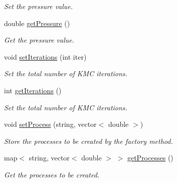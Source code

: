 \begin{DoxyCompactItemize}
\begin{DoxyCompactList}\small\item\em Set the pressure value. \end{DoxyCompactList}\item 
\mbox{\label{classUtils_1_1Parameters_aa24d0f50720f02d44c6eccba5f2864ca}} 
double \mbox{\hyperlink{classUtils_1_1Parameters_aa24d0f50720f02d44c6eccba5f2864ca}{get\+Pressure}} ()
\begin{DoxyCompactList}\small\item\em Get the pressure value. \end{DoxyCompactList}\item 
\mbox{\label{classUtils_1_1Parameters_a68dfe891b7f1a26d7bafa8cbc8488a22}} 
void \mbox{\hyperlink{classUtils_1_1Parameters_a68dfe891b7f1a26d7bafa8cbc8488a22}{set\+Iterations}} (int iter)
\begin{DoxyCompactList}\small\item\em Set the total number of K\+MC iterations. \end{DoxyCompactList}\item 
\mbox{\label{classUtils_1_1Parameters_a164509763c6ddbcc095aa7ab24bb4491}} 
int \mbox{\hyperlink{classUtils_1_1Parameters_a164509763c6ddbcc095aa7ab24bb4491}{get\+Iterations}} ()
\begin{DoxyCompactList}\small\item\em Set the total number of K\+MC iterations. \end{DoxyCompactList}\item 
\mbox{\label{classUtils_1_1Parameters_ac51d57f8c27ad1d50d9f0c08b714ac6f}} 
void \mbox{\hyperlink{classUtils_1_1Parameters_ac51d57f8c27ad1d50d9f0c08b714ac6f}{set\+Process}} (string, vector$<$ double $>$)
\begin{DoxyCompactList}\small\item\em Store the processes to be created by the factory method. \end{DoxyCompactList}\item 
\mbox{\label{classUtils_1_1Parameters_a2ae018731d1166e2ecbb290946280979}} 
map$<$ string, vector$<$ double $>$ $>$ \mbox{\hyperlink{classUtils_1_1Parameters_a2ae018731d1166e2ecbb290946280979}{get\+Processes}} ()
\begin{DoxyCompactList}\small\item\em Get the processes to be created. \end{DoxyCompactList}\end{DoxyCompactItemize}
